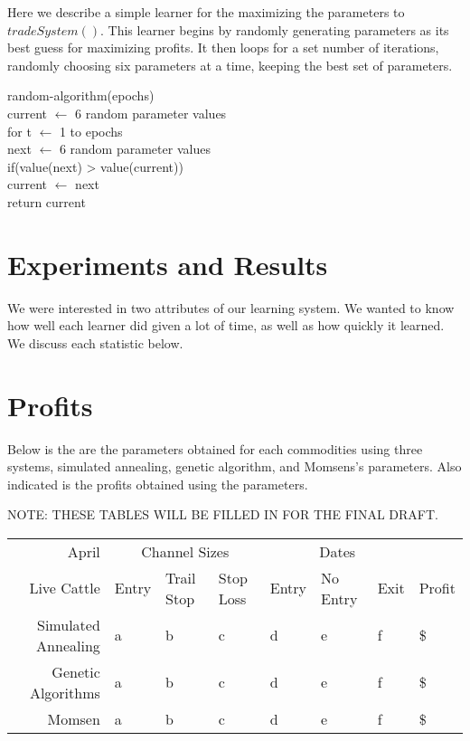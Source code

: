 \documentclass[10pt]{article}
\begin{document}
Here we describe a simple learner for the maximizing the parameters to
$tradeSystem()$.  This learner begins by randomly generating parameters as its
best guess for maximizing profits.  It then loops for a set number of iterations,
randomly choosing  six parameters at a time, keeping the best set of parameters.

\setlength{\parindent}{5mm}
\indent random-algorithm(epochs)\\
\indent \indent current $\leftarrow$ 6 random parameter values\\
\indent \indent for t $\leftarrow$ 1 to epochs\\
\indent \indent \indent next $\leftarrow$ 6 random parameter values\\
\indent \indent \indent if(value(next) > value(current))\\
\indent \indent \indent \indent current $\leftarrow$ next\\
\indent \indent return current\\
\setlength{\parindent}{0mm}

\section{Experiments and Results}

We were interested in two attributes of our learning system.  We wanted
to know how well each learner did given a lot of time, as well as how quickly it
learned.  We discuss each statistic below.

\section{Profits}

Below is the are the parameters obtained for each commodities using three
systems, simulated annealing, genetic algorithm, and Momsens's parameters.  Also
indicated is the profits obtained using the parameters.

NOTE: THESE TABLES WILL BE FILLED IN FOR THE FINAL DRAFT.

\begin{tabular}{|r|l|l|l|l|l|l|l|}
  \hline
  April & \multicolumn{3}{|c|}{Channel Sizes} & \multicolumn{3}{|c|}{Dates} &  \\
  Live Cattle & Entry & Trail Stop & Stop Loss & Entry & No Entry & Exit & Profit\\ \hline
  Simulated Annealing & a & b & c & d & e & f & \$ \\ \hline
  Genetic Algorithms & a & b & c & d & e & f & \$ \\ \hline
  Momsen &  a & b & c & d & e & f & \$ \\ \hline
\end{tabular}
\end{document}
